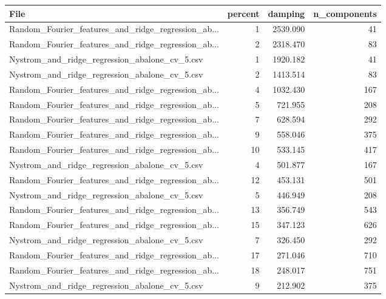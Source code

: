 \begin{tabularx}{\textwidth}{lrrr}
\toprule
                                              File &  percent &  damping &  n\_components \\
\midrule
Random\_Fourier\_features\_and\_ridge\_regression\_ab... &        1 & 2539.090 &            41 \\
Random\_Fourier\_features\_and\_ridge\_regression\_ab... &        2 & 2318.470 &            83 \\
     Nystrom\_and\_ridge\_regression\_abalone\_cv\_5.csv &        1 & 1920.182 &            41 \\
     Nystrom\_and\_ridge\_regression\_abalone\_cv\_5.csv &        2 & 1413.514 &            83 \\
Random\_Fourier\_features\_and\_ridge\_regression\_ab... &        4 & 1032.430 &           167 \\
Random\_Fourier\_features\_and\_ridge\_regression\_ab... &        5 &  721.955 &           208 \\
Random\_Fourier\_features\_and\_ridge\_regression\_ab... &        7 &  628.594 &           292 \\
Random\_Fourier\_features\_and\_ridge\_regression\_ab... &        9 &  558.046 &           375 \\
Random\_Fourier\_features\_and\_ridge\_regression\_ab... &       10 &  533.145 &           417 \\
     Nystrom\_and\_ridge\_regression\_abalone\_cv\_5.csv &        4 &  501.877 &           167 \\
Random\_Fourier\_features\_and\_ridge\_regression\_ab... &       12 &  453.131 &           501 \\
     Nystrom\_and\_ridge\_regression\_abalone\_cv\_5.csv &        5 &  446.949 &           208 \\
Random\_Fourier\_features\_and\_ridge\_regression\_ab... &       13 &  356.749 &           543 \\
Random\_Fourier\_features\_and\_ridge\_regression\_ab... &       15 &  347.123 &           626 \\
     Nystrom\_and\_ridge\_regression\_abalone\_cv\_5.csv &        7 &  326.450 &           292 \\
Random\_Fourier\_features\_and\_ridge\_regression\_ab... &       17 &  271.046 &           710 \\
Random\_Fourier\_features\_and\_ridge\_regression\_ab... &       18 &  248.017 &           751 \\
     Nystrom\_and\_ridge\_regression\_abalone\_cv\_5.csv &        9 &  212.902 &           375 \\

\end{tabularx}
